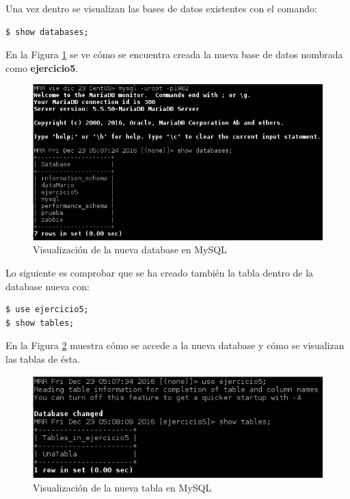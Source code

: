 Una vez dentro se visualizan las bases de datos existentes con el comando:
\begin{lstlisting}[style=fich]
$ show databases;
\end{lstlisting}
\vspace{-22pt}

En la Figura \ref{fig:figura5-2} se ve cómo se encuentra creada la nueva base de datos nombrada como \textbf{ejercicio5}.
\begin{figure}[H] %
	\centering
	\includegraphics[scale=0.9]{figuras/ejercicio5/figura5-2.png} 
	\caption{Visualización de la nueva database en MySQL} 
	\label{fig:figura5-2}
\end{figure}

Lo siguiente es comprobar que se ha creado también la tabla dentro de la database nueva con:
\begin{lstlisting}[style=fich]
$ use ejercicio5;
$ show tables;
\end{lstlisting}
\vspace{-22pt}

En la Figura \ref{fig:figura5-3} muestra cómo se accede a la nueva database y cómo se visualizan las tablas de ésta.
\begin{figure}[H] %
	\centering
	\includegraphics[scale=1]{figuras/ejercicio5/figura5-3.png} 
	\caption{Visualización de la nueva tabla en MySQL} 
	\label{fig:figura5-3}
\end{figure}

